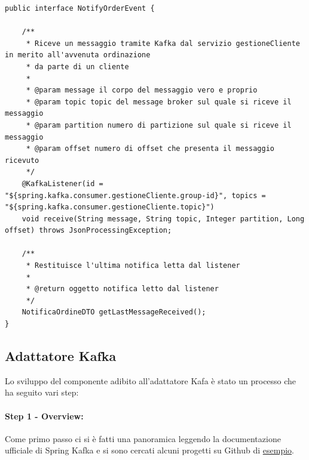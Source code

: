 \begin{lstlisting}[style=myJava, 
    caption={Interfaccia NotifyOrderEvent}, label=lst:notifyordereventIF,
    emph={[3] getLastMessageReceived, receive},
    emphstyle={[3]\color{codeCyan}}]
public interface NotifyOrderEvent {

    /**
     * Riceve un messaggio tramite Kafka dal servizio gestioneCliente in merito all'avvenuta ordinazione
     * da parte di un cliente
     *
     * @param message il corpo del messaggio vero e proprio
     * @param topic topic del message broker sul quale si riceve il messaggio
     * @param partition numero di partizione sul quale si riceve il messaggio
     * @param offset numero di offset che presenta il messaggio ricevuto
     */
    @KafkaListener(id = "${spring.kafka.consumer.gestioneCliente.group-id}", topics = "${spring.kafka.consumer.gestioneCliente.topic}")
    void receive(String message, String topic, Integer partition, Long offset) throws JsonProcessingException;

    /**
     * Restituisce l'ultima notifica letta dal listener
     *
     * @return oggetto notifica letto dal listener
     */
    NotificaOrdineDTO getLastMessageReceived();
}
\end{lstlisting}


\subsection{Adattatore Kafka}
Lo sviluppo del componente adibito all'adattatore Kafa è stato un processo che ha seguito vari step:
\paragraph{Step 1 - Overview:}
Come primo passo ci si è fatti una panoramica leggendo la documentazione ufficiale di Spring Kafka \cite{SpringKafka} e si sono cercati alcuni progetti su Github di \href{https://github.com/devtiro/spring-boot-kafka-tutorial/tree/main}{esempio}.
